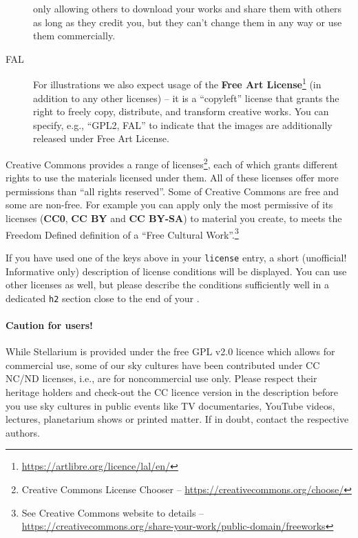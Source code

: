 \begin{description}
    only allowing others to download your works and share them with others as long as they credit you, but they can’t change them in any way or use them commercially.
  \item[FAL] For illustrations we also expect usage of the \textbf{Free Art License}\footnote{\url{https://artlibre.org/licence/lal/en/}} (in addition to any other licenses) --
    it is a ``copyleft'' license that grants the right to freely copy, distribute, and transform creative works. You can specify, e.g., ``GPL2, FAL'' to 
	indicate that the images are additionally released under Free Art License.
\end{description}

\noindent Creative Commons provides a range of licenses\footnote{Creative
  Commons License Chooser --
  \url{https://creativecommons.org/choose/}}, each of which grants
different rights to use the materials licensed under them. All of
these licenses offer more permissions than ``all rights
reserved''. Some of Creative Commons are free and some are
non-free. For example you can apply only the most permissive of its
licenses (\textbf{CC0}, \textbf{CC BY} and \textbf{CC BY-SA}) to
material you create, to meets the Freedom Defined definition of a
``Free Cultural Work''.\footnote{See Creative Commons website to
  details --
  \url{https://creativecommons.org/share-your-work/public-domain/freeworks}}

If you have used one of the keys above in your \texttt{license} entry,
a short (unofficial!  Informative only) description of license
conditions will be displayed. You can use other licenses as well, but
please describe the conditions sufficiently well in a dedicated
\texttt{h2} section close to the end of your
.

\paragraph{Caution for users!} While Stellarium is provided under the free GPL v2.0 licence which allows for commercial use,
some of our sky cultures have been contributed under CC NC/ND licenses,
i.e., are for noncommercial use only.  Please respect their heritage
holders and check-out the CC licence version in the description before
you use sky cultures in public events like TV documentaries, YouTube
videos, lectures, planetarium shows or printed matter. If in doubt,
contact the respective authors.

